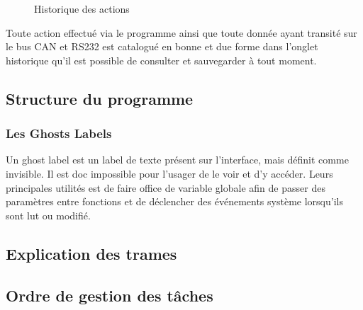 \documentclass[10pt,a4paper,final]{article}
\begin{document}
\begin{spacing}{1.5}
\pagebreak
\begin{figure}[hbtp]
\caption{Historique des actions}
\centering
{}
\end{figure}
Toute action effectué via le programme ainsi que toute donnée ayant transité sur le bus CAN et RS232 est catalogué en bonne et due forme dans l'onglet historique qu'il est possible de consulter et sauvegarder à tout moment.



\subsection{Structure du programme}
\subsubsection{Les Ghosts Labels}
Un ghost label est un label de texte présent sur l'interface, mais définit comme invisible. Il est doc impossible pour l'usager de le voir et d'y accéder. Leurs principales utilités est de faire office de variable globale afin de passer des paramètres entre fonctions et de déclencher des événements système lorsqu'ils sont lut ou modifié.


\subsection{Explication des trames}

\subsection{Ordre de gestion des tâches}






\end{spacing}
\end{document}

